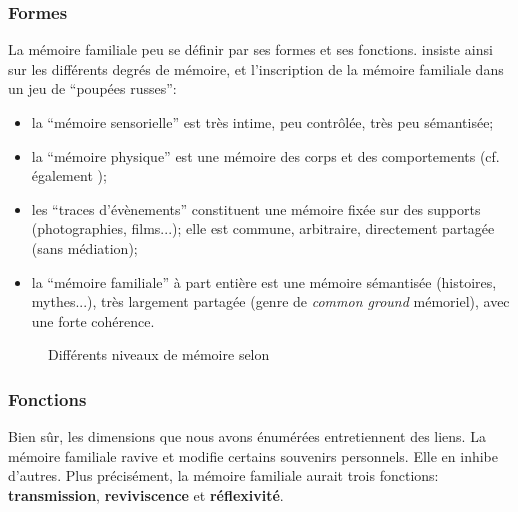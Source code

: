 \documentclass[french]{article}
\begin{document}
			\subsubsection{Formes}
			La mémoire familiale peu se définir par ses formes et ses fonctions. \cite{muxel2012} insiste ainsi sur les différents degrés de mémoire, et l'inscription de la mémoire familiale dans un jeu de ``poupées russes'':
			\begin{itemize}
				\item la ``mémoire sensorielle'' est très intime, peu contrôlée, très peu sémantisée;
				\item la ``mémoire physique'' est une mémoire des corps et des comportements (cf. également \cite[p.~121]{halbwachs1925});
				\item les ``traces d'évènements'' constituent une mémoire fixée sur des supports (photographies, films...); elle est commune, arbitraire, directement partagée (sans médiation);
				\item la ``mémoire familiale'' à part entière est une mémoire sémantisée (histoires, mythes...), très largement partagée (genre de \textit{common ground} mémoriel), avec une forte cohérence.
			\end{itemize}
			\begin{figure}[H]
			\centering
			\caption{Différents niveaux de mémoire selon \cite{muxel2012}}
		\end{figure}
	\subsubsection{Fonctions}
			Bien sûr, les dimensions que nous avons énumérées entretiennent des liens. La mémoire familiale ravive et modifie certains souvenirs personnels. Elle en inhibe d'autres. Plus précisément, la mémoire familiale aurait trois fonctions: \textbf{transmission}, \textbf{reviviscence} et \textbf{réflexivité}.\\
			
\end{document}
